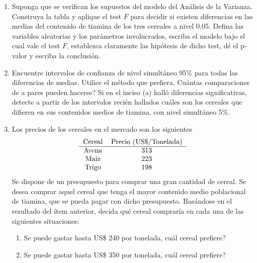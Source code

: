 \documentclass[11pt,a4paper,twoside]{article}%
\begin{document}
\begin{enumerate}
\begin{enumerate}
\item Suponga que se verifican los supuestos del modelo del An\'{a}lisis de la
Varianza. Construya la tabla y aplique el test $F$ para decidir si existen
diferencias en las medias del contenido de tiamina de los tres cereales a
nivel 0.05. Defina las variables aleatorias y los par\'{a}metros involucrados,
escriba el modelo bajo el cual vale el test $F$, establezca claramente las
hip\'{o}tesis de dicho test, d\'{e} el p-valor y escriba la conclusi\'{o}n.

\item Encuentre intervalos de confianza de nivel simult\'{a}neo 95\% para
todas las diferencias de medias. Utilice el m\'{e}todo que prefiera.
\textquestiondown Cu\'{a}ntas comparaciones de a pares pueden hacerse? Si en
el inciso (a) hall\'{o} diferencias significativas, detecte a partir de los
intervalos reci\'{e}n hallados cu\'{a}les son los cereales que difieren en sus
contenidos medios de tiamina, con nivel simult\'{a}neo 5\%.

\item Los precios de los cereales en el mercado son los siguientes%
\[%
\begin{tabular}
[c]{cc}%
Cereal & Precio (US\$/Tonelada)\\\hline
Avena & 313\\
Ma\'{\i}z & 223\\
Trigo & 198
\end{tabular}
\]
Se dispone de un presupuesto para comprar una gran cantidad de cereal. Se
desea comprar aquel cereal que tenga el mayor contenido medio poblacional de
tiamina, que se pueda pagar con dicho presupuesto. Bas\'andose en el resultado del
\'item anterior, decida qu\'e cereal comprar\'ia en cada una
de las siguientes situaciones:

\begin{enumerate}
\item Se puede gastar hasta US\$ 240 por tonelada, \textquestiondown cu\'{a}l
cereal prefiere?

\item Se puede gastar hasta US\$ 350 por tonelada, \textquestiondown cu\'{a}l
cereal prefiere?
\end{enumerate}
\end{enumerate}


\end{enumerate}
\end{document}
